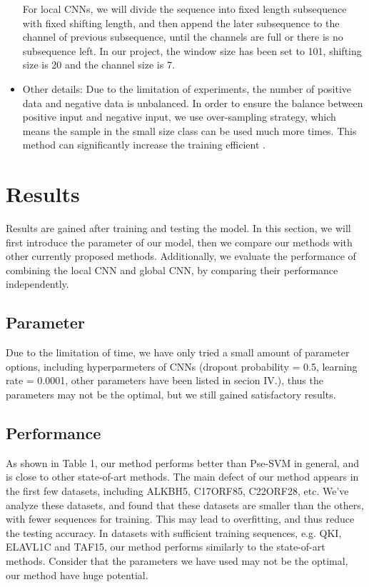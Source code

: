 \documentclass[twoside,twocolumn]{article}
\begin{document}
\begin{itemize}
    For local CNNs, we will divide the sequence into fixed length subsequence with fixed shifting length, and then append the later subsequence to the channel of previous subsequence, until the channels are full or there is no subsequence left. In our project, the window size has been set to 101, shifting size is 20 and the channel size is 7.

    \item Other details: Due to the limitation of experiments, the number of positive data and negative data is unbalanced. In order to ensure the balance between positive input and negative input, we use over-sampling strategy, which means the sample in the small size class can be used much more times. This method can significantly increase the training efficient \cite{ref4}.
\end{itemize}
\section{Results}
Results are gained after training and testing the model. In this section, we will
first introduce the parameter of our model, then we compare our methods with other
currently proposed methods. Additionally, we evaluate the performance of combining
the local CNN and global CNN, by comparing their performance independently.

\subsection{Parameter}
Due to the limitation of time, we have only tried a small amount of parameter options,
including hyperparmeters of CNNs (dropout probability = 0.5, learning rate = 0.0001, other
parameters have been listed in secion IV.), thus the parameters may not be the optimal, 
but we still gained satisfactory results.

\subsection{Performance}
As shown in Table 1, our method performs better than Pse-SVM in general,
and is close to other state-of-art methods. The main defect of our method
appears in the first few datasets, including ALKBH5, C17ORF85, C22ORF28, etc.
We've analyze these datasets, and found that these datasets are smaller than the
others, with fewer sequences for training. This may lead to overfitting, and thus
reduce the testing accuracy.
In datasets with sufficient training sequences, e.g. QKI, ELAVL1C and TAF15, our
method performs similarly to the state-of-art methods. Consider that the parameters
we have used may not be the optimal, our method have huge potential.
\end{document}
